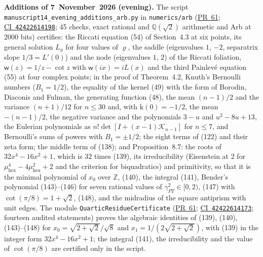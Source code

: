 \documentclass[11pt,a4paper]{article}
\newcommand{\R}{https://github.com/ralfanop/Certifications_Eulerian_polar-curve_computations}
\newcommand{\PR}[1]{\href{\R/pull/#1}{PR~#1}}
\newcommand{\CI}[1]{\href{\R/actions/runs/#1}{CI~\texttt{#1}}}
\newcommand{\eq}[1]{(#1)}
\begin{document}
\textbf{Additions of 7~November~2026 (evening).} The script \texttt{manuscript14\_\allowbreak evening\_\allowbreak additions\_\allowbreak arb.py} in \texttt{numerics/\allowbreak arb} (\PR{61}; \CI{42422614198}; 45 checks, exact rational and $\mathbb Q(\sqrt2)$ arithmetic and Arb at 2000 bits) certifies: the Riccati equation \eq{54} of Section~4.3 at six points, its general solution $L_\varrho$ for four values of $\varrho$, the saddle (eigenvalues $1$, $-2$, separatrix slope $1/3=L'(0)$) and the node (eigenvalues $1$, $2$) of the Riccati foliation, $\mathsf w(z)=1/z-\cot z$ with $\mathsf w(ix)=iL(x)$ and the third Painlev\'e equation \eq{55} at four complex points; in the proof of Theorem~4.2, Knuth's Bernoulli numbers ($B_1=1/2$), the equality of the kernel \eq{49} with the form of Borodin, Diaconis and Fulman, the generating function \eq{48}, the mean $(n-1)/2$ and the variance $(n+1)/12$ for $n\leq30$ and, with $\mathrm k(0)=-1/2$, the mean $-(n-1)/2$, the negative variance and the polynomials $3-u$ and $u^2-8u+13$, the Eulerian polynomials as $n!\det[I+(x-1)\mathcal K_{n-1}]$ for $n\leq7$, and Bernoulli's sums of powers with $B_1=\pm1/2$; the eight terms of \eq{122} and their zeta form; the middle term of \eq{138}; and Proposition~8.7: the roots of $32x^4-16x^2+1$, which is $32$ times \eq{139}, its irreducibility (Eisenstein at $2$ for $\mu_{\mathrm{hex}}^4-4\mu_{\mathrm{hex}}^2+2$ and the criterion for biquadratics) and primitivity, so that it is the minimal polynomial of $x_0$ over $\mathbb Z$, \eq{140}, the integral \eq{141}, Bender's polynomial \eq{143}--\eq{146} for seven rational values of $\gamma_{\mathit{PT}}^2\in[0,2)$, \eq{147} with $\cot(\pi/8)=1+\sqrt2$, \eq{148}, and the midradius of the square antiprism with unit edges. The module \texttt{QuarticResidueCertificate} (\PR{61}; \CI{42422614173}; fourteen audited statements) proves the algebraic identities of \eq{139}, \eq{140}, \eq{143}--\eq{148} for $x_0=\sqrt{2+\sqrt2}/\sqrt8$ and $x_1=1/(2\sqrt{2+\sqrt2})$, with \eq{139} in the integer form $32x^4-16x^2+1$; the integral \eq{141}, the irreducibility and the value of $\cot(\pi/8)$ are certified only in the script.
\end{document}
